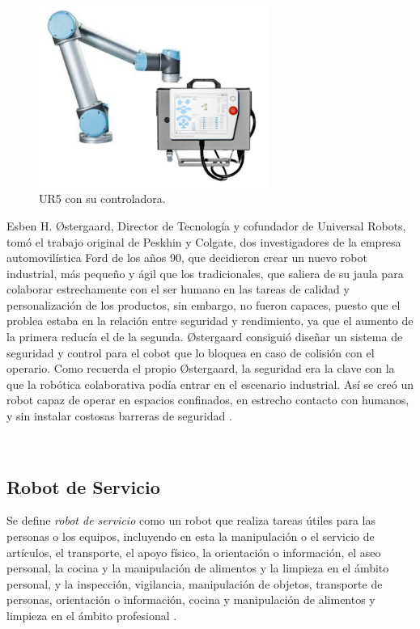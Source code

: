 \begin{itemize}
  \begin{figure} [h!]
    \begin{center}
      \includegraphics[width=75mm]{figs/UR5_controller.png}
    \end{center}
    \caption{UR5 con su controladora.}
    \label{fig:UR5}
  \end{figure}
  
  Esben H. Østergaard, Director de Tecnología y cofundador de Universal Robots, tomó el trabajo original de Peskhin y Colgate, dos investigadores de la empresa automovilística Ford de los años 90, que decidieron crear un nuevo robot industrial, más pequeño y ágil que los tradicionales, que saliera de su jaula para colaborar estrechamente con el ser humano en las tareas de calidad y personalización de los productos, sin embargo, no fueron capaces, puesto que el problea estaba en la relación entre seguridad y rendimiento, ya que el aumento de la primera reducía el de la segunda. Østergaard consiguió diseñar un sistema de seguridad y control para el cobot que lo bloquea en caso de colisión con el operario. Como recuerda el propio Østergaard, la seguridad era la clave con la que la robótica colaborativa podía entrar en el escenario industrial. Así se creó un robot capaz de operar en espacios confinados, en estrecho contacto con humanos, y sin instalar costosas barreras de seguridad \cite{Cusano22}.
  
   
\end{itemize}\

\pagebreak

\subsection{Robot de Servicio}
\label{sec:robot_servicio}

Se define \textit{robot de servicio} como un robot que realiza tareas útiles para las personas o los equipos, incluyendo en esta la manipulación o el servicio de artículos, el transporte, el apoyo físico, la orientación o información, el aseo personal, la cocina y la manipulación de alimentos y la limpieza en el ámbito personal, y la inspección, vigilancia, manipulación de objetos, transporte de personas, orientación o información, cocina y manipulación de alimentos y limpieza en el ámbito profesional \cite{ISO8373}.
 
